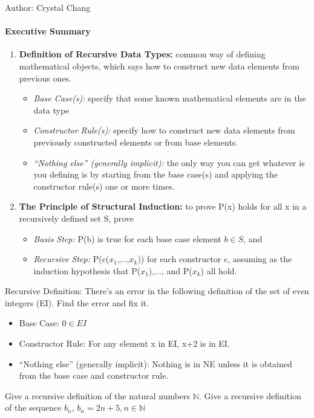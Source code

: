 \documentclass[solution, letterpaper]{cs20inclass}
\begin{document}

\noindent Author: Crystal Chang

\paragraph*{Executive Summary}
\begin{enumerate}
\item \textbf{Definition of Recursive Data Types:} common way of defining mathematical objects, which says how to construct new data elements from previous ones.
\begin{itemize}
\item {\em Base Case(s):} specify that some known mathematical elements are in the data type
\item {\em Constructor Rule(s):} specify how to construct new data elements from previously constructed elements or from base elements.
\item {\em “Nothing else” (generally implicit):} the only way you can get whatever is you defining is by starting from the base case(s) and applying the constructor rule(s) one or more times.
\end{itemize}

\item \textbf{The Principle of Structural Induction:} to prove P(x) holds for all x in a recursively defined set S, prove
\begin{itemize}
\item {\em Basis Step:} P(b) is true for each base case element $b \in S$, and 
\item {\em Recursive Step:} P(c($x_1$,...,$x_k$)) for each constructor c, assuming as the induction hypothesis that P($x_1$),..., and P($x_k$) all hold.
\end{itemize}
\end{enumerate}

\problem Recursive Definition:
\subproblem There's an error in the following definition of the set of even integers (EI). Find the error and fix it. 
\begin{itemize}
\item Base Case:  $0\in EI$
\item Constructor Rule: For any element x in EI, x+2 is in EI. 
\item “Nothing else” (generally implicit): Nothing is in NE unless it is obtained from the base case and constructor rule.
\end{itemize}
\subproblem Give a recursive definition of the natural numbers $\mathbb{N}$.
\subproblem Give a recursive definition of the sequence $b_n$, $b_n=2n+5,  n\in\mathbb{N}$
\end{document}
